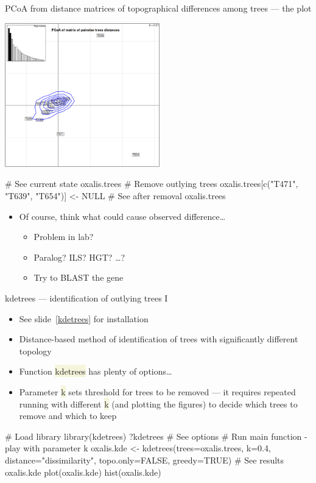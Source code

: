 \documentclass[compress, xelatex, 11pt, xcolor=svgnames, aspectratio=169,
	hyperref={
		bookmarks=true,
		unicode=true,
		colorlinks=true,
		pdftitle={Molecular data in R},
		plainpages=false,
		pdfauthor={Vojtech Zeisek},
		pdfsubject={Course about phylogeny and evolution in R},
		pdfcreator={XeLaTeX},
		pdfkeywords={R, evolution, phylogeny, molecular data},
		linkcolor=Crimson, %
		anchorcolor=Magenta, %
		citecolor=Magenta, %
		filecolor=Magenta, %
		menucolor=Magenta, %
		urlcolor=DodgerBlue, %
		},
	url={hyphens, lowtilde} %
	]{beamer}
\renewcommand{\texttt}[1]{\colorbox{Beige}{{\ttfamily #1}}}
\begin{document}
\begin{frame}[fragile]{PCoA from distance matrices of topographical differences among trees --- the plot}
	\begin{multicols}{2}
		\begin{center}
			\includegraphics[height=6.25cm]{pcoa-trees.png}
		\end{center}
		\begin{spluscode}
    # See current state
    oxalis.trees
    # Remove outlying trees
    oxalis.trees[c("T471", "T639",
      "T654")] <- NULL
    # See after removal
    oxalis.trees
		\end{spluscode}
		\begin{itemize}
			\item Of course, think what could cause observed difference\ldots
			\begin{itemize}
				\item Problem in lab?
				\item Paralog? ILS? HGT? \ldots ?
				\item Try to BLAST the gene
			\end{itemize}
		\end{itemize}
	\end{multicols}
\end{frame}

\begin{frame}[fragile]{kdetrees --- identification of outlying trees I}
	\begin{itemize}
		\item See slide~\ref{kdetrees} for installation
		\item Distance-based method of identification of trees with significantly different topology
		\item Function \texttt{kdetrees} has plenty of options\ldots
		\item Parameter \texttt{k} sets threshold for trees to be removed --- it requires repeated running with different \texttt{k} (and plotting the figures) to decide which trees to remove and which to keep
	\end{itemize}
	\begin{spluscode}
    # Load library
    library(kdetrees)
    ?kdetrees # See options
    # Run main function - play with parameter k
    oxalis.kde <- kdetrees(trees=oxalis.trees, k=0.4,
      distance="dissimilarity", topo.only=FALSE, greedy=TRUE)
    # See results
    oxalis.kde
    plot(oxalis.kde)
    hist(oxalis.kde)
	\end{spluscode}
\end{frame}
\end{document}
